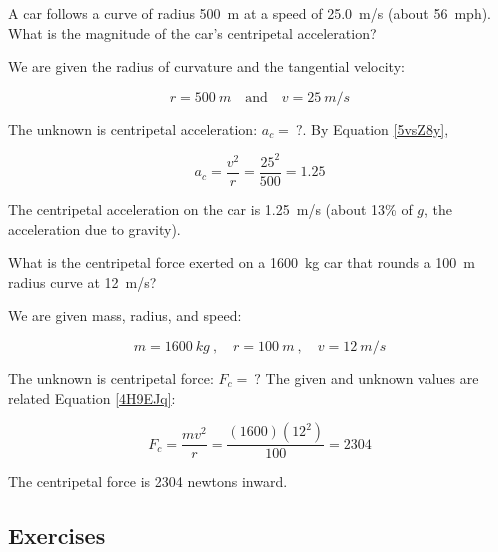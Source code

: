 \documentclass[main.tex]{subfiles}
\begin{document}
\begin{example}
    A car follows a curve of radius \SI{500}{m} at a speed of \SI{25.0}{m/s} (about \SI{56}{mph}). What is the magnitude of the car's centripetal acceleration?
\end{example}

\Solution We are given the radius of curvature and the tangential velocity:

\begin{equation*}
    r = \SI{500}{m} \quad \text{and} \quad v = \SI{25}{m/s}
\end{equation*}

The unknown is centripetal acceleration: $a_c =\ ?$. By Equation \eqref{5vsZ8y},

\begin{equation*}
    a_c = \frac{v^2}{r} = \frac{25^2}{500} = 1.25 
\end{equation*}

The centripetal acceleration on the car is \SI{1.25}{m/s} (about 13\% of $g$, the acceleration due to gravity).

\solutionEnd

\begin{example}
    What is the centripetal force exerted on a \SI{1600}{kg} car that rounds a \SI{100}{m} radius curve at \SI{12}{m/s}?
\end{example}

\Solution We are given mass, radius, and speed:

\begin{equation*}
    m = \SI{1600}{kg}\ , \quad 
    r = \SI{100}{m}\ , \quad
    v = \SI{12}{m/s}
\end{equation*}

The unknown is centripetal force: $F_c =\ ?$ The given and unknown values are related Equation \eqref{4H9EJq}:

\begin{equation*}
    F_c = \frac{m v^2}{r} = \frac{(1600)(12^2)}{100} = 2304
\end{equation*}

The centripetal force is 2304 newtons inward. 

\solutionEnd

\subsection{Exercises}

\subsubsection*{}
\end{document}
